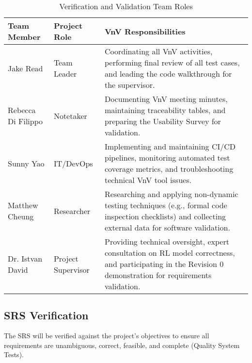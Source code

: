 \documentclass[12pt, titlepage]{article}
\begin{document}
\begin{table}[h!]
  \centering
  \caption{Verification and Validation Team Roles}
  \label{tab:vnv-team-roles}
  \begin{tabularx}{\textwidth}{|p{2cm}|p{2cm}|X|}
  \hline
  \textbf{Team Member} & \textbf{Project Role} & \textbf{VnV Responsibilities} \\ \hline
  Jake Read & Team Leader & Coordinating all VnV activities, performing final review of all test cases, and leading the code walkthrough for the supervisor. \\ \hline
  Rebecca Di Filippo & Notetaker & Documenting VnV meeting minutes, maintaining traceability tables, and preparing the Usability Survey for validation. \\ \hline
  Sunny Yao & IT/DevOps & Implementing and maintaining CI/CD pipelines, monitoring automated test coverage metrics, and troubleshooting technical VnV tool issues. \\ \hline
  Matthew Cheung & Researcher & Researching and applying non-dynamic testing techniques (e.g., formal code inspection checklists) and collecting external data for software validation. \\ \hline
  Dr. Istvan David & Project Supervisor & Providing technical oversight, expert consultation on RL model correctness, and participating in the Revision 0 demonstration for requirements validation. \\ \hline
  \end{tabularx}
\end{table}

\FloatBarrier


\subsection{SRS Verification}




The SRS will be verified against the project’s objectives to ensure all requirements are unambiguous, correct, feasible, and complete (Quality System Tests).
\end{document}
